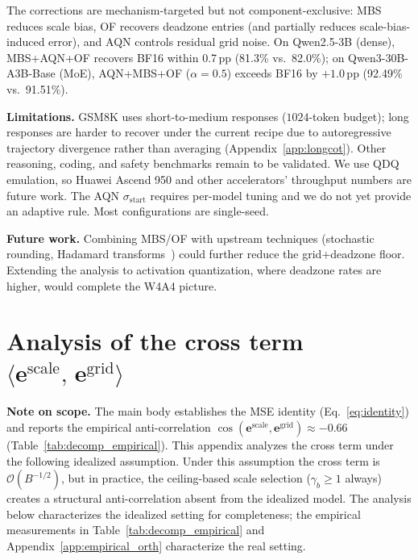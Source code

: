 \documentclass{article}
\theoremstyle{definition}
\theoremstyle{remark}
\newcommand{\be}{\bm{e}}
\begin{document}
The corrections are mechanism-targeted but not component-exclusive: MBS reduces scale bias, OF recovers deadzone entries (and partially reduces scale-bias-induced error), and AQN controls residual grid noise. On Qwen2.5-3B (dense), MBS+AQN+OF recovers BF16 within 0.7\,pp (81.3\% vs.\ 82.0\%); on Qwen3-30B-A3B-Base (MoE), AQN+MBS+OF ($\alpha\!=\!0.5$) exceeds BF16 by $+1.0$\,pp (92.49\% vs.\ 91.51\%).

\textbf{Limitations.}\label{sec:limitations}
GSM8K uses short-to-medium responses ($1024$-token budget); long responses are harder to recover under the current recipe due to autoregressive trajectory divergence rather than averaging (Appendix~\ref{app:longcot}). Other reasoning, coding, and safety benchmarks remain to be validated. We use QDQ emulation, so Huawei Ascend 950 and other accelerators' throughput numbers are future work. The AQN $\sigma_{\mathrm{start}}$ requires per-model tuning and we do not yet provide an adaptive rule. Most configurations are single-seed.

\textbf{Future work.}
Combining MBS/OF with upstream techniques (stochastic rounding, Hadamard transforms~\citep{tseng2025trainingllmsmxfp4}) could further reduce the grid+deadzone floor. Extending the analysis to activation quantization, where deadzone rates are higher, would complete the W4A4 picture.



{
\small


}



\appendix

\section{Analysis of the cross term \texorpdfstring{$\langle \be^{\mathrm{scale}},\, \be^{\mathrm{grid}} \rangle$}{<e\^scale, e\^grid>}}
\label{app:proof_lemma2}

\textbf{Note on scope.} The main body establishes the MSE identity (Eq.~\ref{eq:identity}) and reports the empirical anti-correlation $\cos(\be^{\mathrm{scale}}, \be^{\mathrm{grid}}) \approx -0.66$ (Table~\ref{tab:decomp_empirical}). This appendix analyzes the cross term under the following idealized assumption. Under this assumption the cross term is $\mathcal{O}(B^{-1/2})$, but in practice, the ceiling-based scale selection ($\gamma_b \geq 1$ always) creates a structural anti-correlation absent from the idealized model. The analysis below characterizes the idealized setting for completeness; the empirical measurements in Table~\ref{tab:decomp_empirical} and Appendix~\ref{app:empirical_orth} characterize the real setting.
\end{document}
